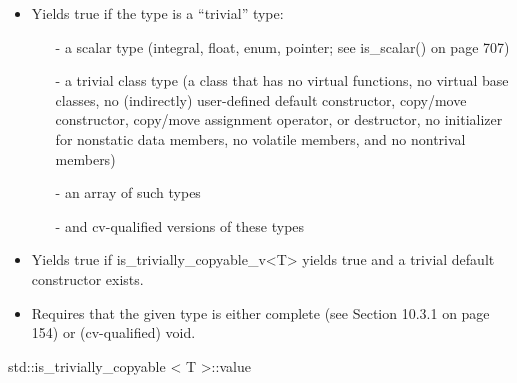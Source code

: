\begin{itemize}
\item 
Yields true if the type is a “trivial” type:

\begin{itemize}
\item [-]
a scalar type (integral, float, enum, pointer; see is\_scalar() on page 707)

\item [-]
a trivial class type (a class that has no virtual functions, no virtual base classes, no (indirectly) user-defined default constructor, copy/move constructor, copy/move assignment operator, or destructor, no initializer for nonstatic data members, no volatile members, and no nontrival members)

\item [-]
an array of such types

\item [-]
and cv-qualified versions of these types
\end{itemize}

\item 
Yields true if is\_trivially\_copyable\_v<T> yields true and a trivial default constructor exists.

\item 
Requires that the given type is either complete (see Section 10.3.1 on page 154) or (cv-qualified) void.
\end{itemize}

std::is\_trivially\_copyable < T >::value

